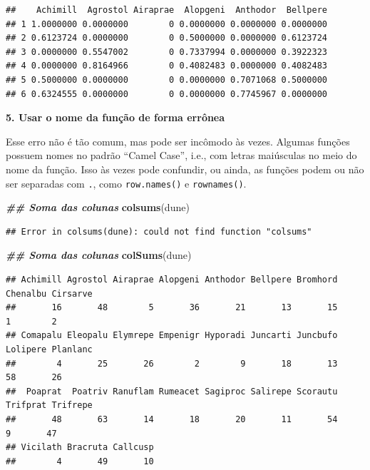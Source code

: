\documentclass[
]{article}
\newenvironment{Shaded}{\begin{snugshade}}{\end{snugshade}}
\newcommand{\DocumentationTok}[1]{\textcolor[rgb]{0.56,0.35,0.01}{\textbf{\textit{#1}}}}
\newcommand{\FunctionTok}[1]{\textcolor[rgb]{0.13,0.29,0.53}{\textbf{#1}}}
\newcommand{\NormalTok}[1]{#1}
\begin{document}
\begin{verbatim}
##    Achimill  Agrostol Airaprae  Alopgeni  Anthodor  Bellpere
## 1 1.0000000 0.0000000        0 0.0000000 0.0000000 0.0000000
## 2 0.6123724 0.0000000        0 0.5000000 0.0000000 0.6123724
## 3 0.0000000 0.5547002        0 0.7337994 0.0000000 0.3922323
## 4 0.0000000 0.8164966        0 0.4082483 0.0000000 0.4082483
## 5 0.5000000 0.0000000        0 0.0000000 0.7071068 0.5000000
## 6 0.6324555 0.0000000        0 0.0000000 0.7745967 0.0000000
\end{verbatim}

\textbf{5. Usar o nome da função de forma errônea}

Esse erro não é tão comum, mas pode ser incômodo às vezes. Algumas funções possuem nomes no padrão ``Camel Case'', i.e., com letras maiúsculas no meio do nome da função. Isso às vezes pode confundir, ou ainda, as funções podem ou não ser separadas com \texttt{.}, como \texttt{row.names()} e \texttt{rownames()}.

\begin{Shaded}
\begin{Highlighting}[]
\DocumentationTok{\#\# Soma das colunas}
\FunctionTok{colsums}\NormalTok{(dune)}
\end{Highlighting}
\end{Shaded}

\begin{verbatim}
## Error in colsums(dune): could not find function "colsums"
\end{verbatim}

\begin{Shaded}
\begin{Highlighting}[]
\DocumentationTok{\#\# Soma das colunas}
\FunctionTok{colSums}\NormalTok{(dune)}
\end{Highlighting}
\end{Shaded}

\begin{verbatim}
## Achimill Agrostol Airaprae Alopgeni Anthodor Bellpere Bromhord Chenalbu Cirsarve 
##       16       48        5       36       21       13       15        1        2 
## Comapalu Eleopalu Elymrepe Empenigr Hyporadi Juncarti Juncbufo Lolipere Planlanc 
##        4       25       26        2        9       18       13       58       26 
##  Poaprat  Poatriv Ranuflam Rumeacet Sagiproc Salirepe Scorautu Trifprat Trifrepe 
##       48       63       14       18       20       11       54        9       47 
## Vicilath Bracruta Callcusp 
##        4       49       10
\end{verbatim}
\end{document}
